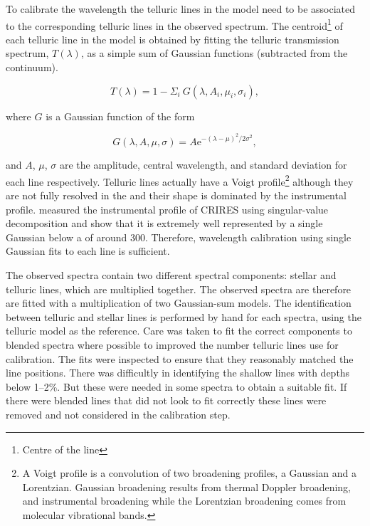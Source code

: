 To calibrate the wavelength the telluric lines in the model need to be associated to the corresponding telluric lines in the observed spectrum. The centroid\footnote{Centre of the line} of each telluric line in the model is obtained by fitting the telluric transmission spectrum, \(T(\lambda)\), as a simple sum of Gaussian functions (subtracted from the continuum).

\begin{equation}
T(\lambda) = 1 - {\Sigma}_{i}\ G(\lambda, A_{i}, {\mu}_{i}, {\sigma}_{i}),
\end{equation}

where \(G\) is a Gaussian function of the form

\begin{equation}
G(\lambda, A, \mu, \sigma) = {A \textrm{e}}^{{-(\lambda-\mu)}^{2}/2\sigma^{2}},
\end{equation}

and \(A\), \(\mu\), \(\sigma\) are the amplitude, central wavelength, and standard deviation for each line respectively. Telluric lines actually have a Voigt profile\footnote{A Voigt profile is a convolution of two broadening profiles, a Gaussian and a Lorentzian. Gaussian broadening results from thermal Doppler broadening, and instrumental broadening while the Lorentzian broadening comes from molecular vibrational bands\citep{meier_art_2005}.} although they are not fully resolved in the \nir{} and their shape is dominated by the instrumental profile. \citet{seifahrt_synthesising_2010} measured the instrumental profile of {CRIRES} using singular-value decomposition and show that it is extremely well represented by a single Gaussian below a \snr{} of around 300. Therefore, wavelength calibration using single Gaussian fits to each line is sufficient.

The observed spectra contain two different spectral components: stellar and telluric lines, which are multiplied together. The observed spectra are therefore are fitted with a multiplication of two Gaussian-sum models. The identification between telluric and stellar lines is performed by hand for each spectra, using the telluric model as the reference. Care was taken to fit the correct components to blended spectra where possible to improved the number telluric lines use for calibration. The fits were inspected to ensure that they reasonably matched the line positions. There was difficultly in identifying the shallow lines with depths below 1--2\%. But these were needed in some spectra to obtain a suitable fit. If there were blended lines that did not look to fit correctly these lines were removed and not considered in the calibration step.

